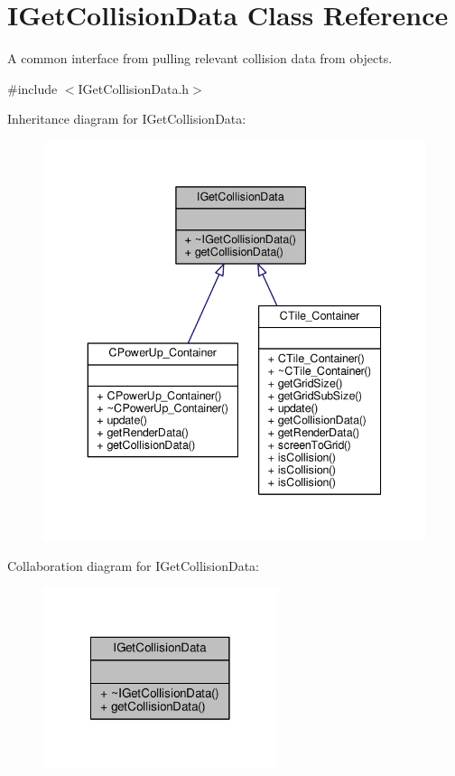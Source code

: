 \hypertarget{classIGetCollisionData}{\section{I\-Get\-Collision\-Data Class Reference}
\label{classIGetCollisionData}
}


A common interface from pulling relevant collision data from objects.  




{\ttfamily \#include $<$I\-Get\-Collision\-Data.\-h$>$}



Inheritance diagram for I\-Get\-Collision\-Data\-:
\nopagebreak
\begin{figure}[H]
\begin{center}
\leavevmode
\includegraphics[width=339pt]{classIGetCollisionData__inherit__graph}
\end{center}
\end{figure}


Collaboration diagram for I\-Get\-Collision\-Data\-:
\nopagebreak
\begin{figure}[H]
\begin{center}
\leavevmode
\includegraphics[width=194pt]{classIGetCollisionData__coll__graph}
\end{center}
\end{figure}
